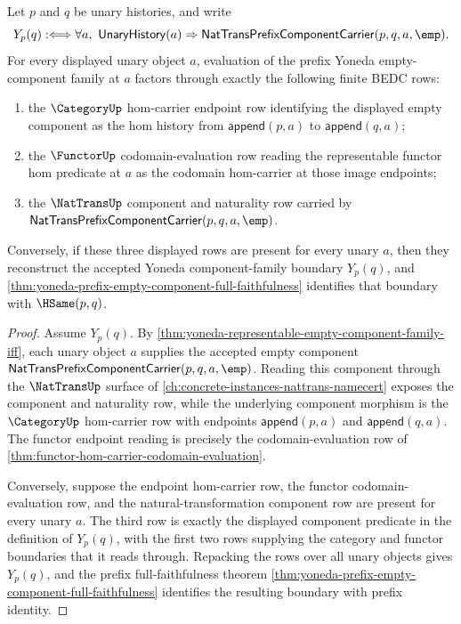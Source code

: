 \begin{theorem}
\label{thm:yoneda-component-evaluation-boundary}
Let $p$ and $q$ be unary histories, and write
$$
Y_p(q) :\Longleftrightarrow
\forall a,\ \mathsf{UnaryHistory}(a)\Rightarrow
\mathsf{NatTransPrefixComponentCarrier}(p,q,a,\emp).
$$
For every displayed unary object $a$, evaluation of the prefix Yoneda
empty-component family at $a$ factors through exactly the following finite
BEDC rows:
\begin{enumerate}
  \item the $\CategoryUp$ hom-carrier endpoint row identifying the displayed
  empty component as the hom history from $\mathsf{append}(p,a)$ to
  $\mathsf{append}(q,a)$;
  \item the $\FunctorUp$ codomain-evaluation row reading the representable
  functor hom predicate at $a$ as the codomain hom-carrier at those image
  endpoints;
  \item the $\NatTransUp$ component and naturality row carried by
  $\mathsf{NatTransPrefixComponentCarrier}(p,q,a,\emp)$.
\end{enumerate}
Conversely, if these three displayed rows are present for every unary $a$, then
they reconstruct the accepted Yoneda component-family boundary $Y_p(q)$, and
\autoref{thm:yoneda-prefix-empty-component-full-faithfulness} identifies that
boundary with $\HSame(p,q)$.
\end{theorem}
\begin{proof}
Assume $Y_p(q)$. By
\autoref{thm:yoneda-representable-empty-component-family-iff}, each unary
object $a$ supplies the accepted empty component
$\mathsf{NatTransPrefixComponentCarrier}(p,q,a,\emp)$. Reading this component
through the $\NatTransUp$ surface of
\autoref{ch:concrete-instances-nattrans-namecert} exposes the component and
naturality row, while the underlying component morphism is the $\CategoryUp$
hom-carrier row with endpoints $\mathsf{append}(p,a)$ and
$\mathsf{append}(q,a)$. The functor endpoint reading is precisely the
codomain-evaluation row of
\autoref{thm:functor-hom-carrier-codomain-evaluation}.

Conversely, suppose the endpoint hom-carrier row, the functor
codomain-evaluation row, and the natural-transformation component row are
present for every unary $a$. The third row is exactly the displayed component
predicate in the definition of $Y_p(q)$, with the first two rows supplying the
category and functor boundaries that it reads through. Repacking the rows over
all unary objects gives $Y_p(q)$, and the prefix full-faithfulness theorem
\autoref{thm:yoneda-prefix-empty-component-full-faithfulness} identifies the
resulting boundary with prefix identity.
\end{proof}

